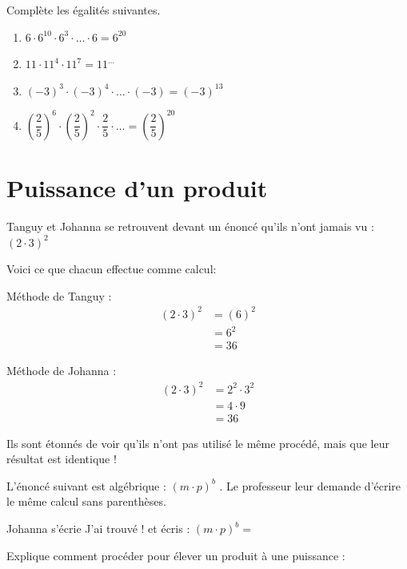 \documentclass[../../syllabus_2.tex]{subfiles}
\begin{document}
\begin{exercise}
	Complète les égalités suivantes.
	\begin{enumerate} [cols=2, itemsep=2cm]
		\item \(6\cdot6^{10}\cdot6^3\cdot \ldots \cdot 6=6^{20}\)
		\item \(11\cdot11^4\cdot 11^7=11^{\ldots}\)
		\item \((-3)^3\cdot(-3)^4\cdot \ldots \cdot (-3)=(-3)^{13}\)
		\item \(\left(\dfrac{2}{5}\right)^6\cdot\left(\dfrac{2}{5}\right)^2 \cdot \dfrac{2}{5} \cdot \ldots = \left(\dfrac{2}{5}\right)^{20}\)
	\end{enumerate}
\end{exercise}

\section{Puissance d'un produit}
Tanguy et Johanna se retrouvent devant un énoncé qu'ils n'ont jamais vu : \((2\cdot3)^2\)

Voici ce que chacun effectue comme calcul:

\parbox{.5\linewidth}{%
	\centering
	Méthode de Tanguy :
	\begin{align*}
		(2\cdot 3)^2
		 & = (6)^2 \\
		 & = 6^2   \\
		 & = 36
	\end{align*}}
\parbox{.5\linewidth}{%
	\centering
	Méthode de Johanna :
	\begin{align*}
		(2\cdot 3)^2
		 & = 2^2\cdot3^2 \\
		 & = 4\cdot 9    \\
		 & = 36
	\end{align*}
}

Ils sont étonnés de voir qu'ils n'ont pas utilisé le même procédé, mais que leur résultat est identique !

L'énoncé suivant est algébrique : \((m\cdot p)^b\) . Le professeur leur demande d'écrire le même calcul sans parenthèses.

Johanna s'écrie \og J'ai trouvé !\fg{} et écris : \((m\cdot p)^b=\)\dotfill

Explique comment procéder pour élever un produit à une puissance :


\begin{center}
\end{center}
\end{document}
